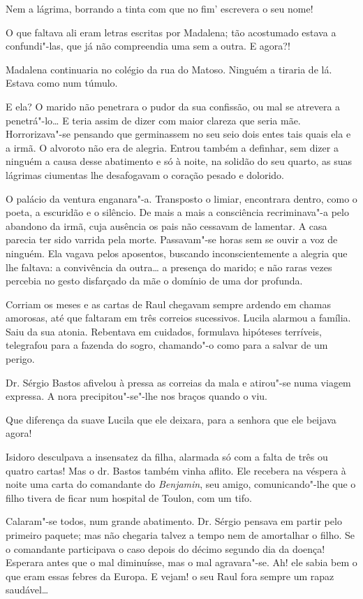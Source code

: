 Nem a lágrima, borrando a tinta com que no
fim' escrevera o seu nome!

O que faltava ali eram letras escritas por Madalena; tão acostumado
estava a confundi"-las, que já não compreendia uma sem a outra. E agora?!

Madalena continuaria no colégio da rua do Matoso. Ninguém a tiraria de
lá. Estava como num túmulo.

E ela? O marido não penetrara o pudor da sua confissão, ou mal se
atrevera a penetrá"-lo\ldots{} E teria assim de dizer com maior clareza que
seria mãe. Horrorizava"-se pensando que germinassem no seu seio dois
entes tais quais ela e a irmã. O alvoroto não era de alegria. Entrou
também a definhar, sem dizer a ninguém a causa desse abatimento e só à
noite, na solidão do seu quarto, as suas lágrimas ciumentas lhe
desafogavam o coração pesado e dolorido.

O palácio da ventura enganara"-a. Transposto o limiar, encontrara dentro,
como o poeta, a escuridão e o silêncio. De mais a mais a consciência
recriminava"-a pelo abandono da irmã, cuja ausência os pais não cessavam
de lamentar. A casa parecia ter sido varrida pela morte. Passavam"-se
horas sem se ouvir a voz de ninguém. Ela vagava pelos aposentos,
buscando inconscientemente a alegria que lhe faltava: a convivência da
outra\ldots{} a presença do marido; e não raras vezes percebia no gesto
disfarçado da mãe o domínio de uma dor profunda.

Corriam os meses e as cartas de Raul chegavam sempre ardendo em chamas
amorosas, até que faltaram em três correios sucessivos. Lucila alarmou a
família. Saiu da sua atonia. Rebentava em cuidados, formulava hipóteses
terríveis, telegrafou para a fazenda do sogro, chamando"-o como para a
salvar de um perigo.

Dr. Sérgio Bastos afivelou à pressa as correias da mala e atirou"-se numa
viagem expressa. A nora precipitou"-se"-lhe nos braços quando o viu.

Que diferença da suave Lucila que ele deixara, para a senhora que ele
beijava agora!

Isidoro desculpava a insensatez da filha, alarmada só com a falta de
três ou quatro cartas! Mas o dr. Bastos também vinha aflito. Ele
recebera na véspera à noite uma carta do comandante do \emph{Benjamin},
seu amigo, comunicando"-lhe que o filho tivera de ficar num hospital de
Toulon, com um tifo.

Calaram"-se todos, num grande abatimento. Dr. Sérgio pensava em partir
pelo primeiro paquete; mas não chegaria talvez a tempo nem de amortalhar
o filho. Se o comandante participava o caso depois do décimo segundo dia
da doença! Esperara antes que o mal diminuísse, mas o mal agravara"-se.
Ah! ele sabia bem o que eram essas febres da Europa. E vejam! o seu Raul
fora sempre um rapaz saudável\ldots{}

